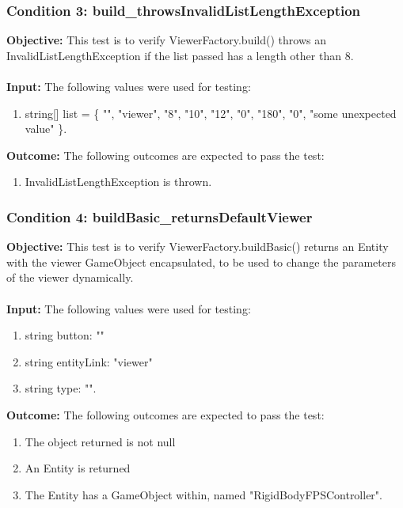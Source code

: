 \documentclass[a4paper,12pt]{article}
\begin{document}
		\subsubsection{Condition 3: build\_throwsInvalidListLengthException}
			\textbf{Objective:} This test is to verify ViewerFactory.build() throws an InvalidListLengthException if the list passed has a length other than 8.\\\\
			\textbf{Input:} The following values were used for testing:
				\begin{enumerate}
					\item string[] list = \{ "", "viewer", "8", "10", "12", "0", "180", "0", "some unexpected value" \}.
				\end{enumerate}
			\textbf{Outcome:} The following outcomes are expected to pass the test:
				\begin{enumerate}
					\item InvalidListLengthException is thrown.
				\end{enumerate}
		\subsubsection{Condition 4: buildBasic\_returnsDefaultViewer}
			\textbf{Objective:} This test is to verify ViewerFactory.buildBasic() returns an Entity with the viewer GameObject encapsulated, to be used to change the parameters of the viewer dynamically.\\\\
			\textbf{Input:} The following values were used for testing:
				\begin{enumerate}
					\item string button: ""
					\item string entityLink: "viewer"
					\item string type: "".
				\end{enumerate}
			\textbf{Outcome:} The following outcomes are expected to pass the test:
				\begin{enumerate}
					\item The object returned is not null
					\item An Entity is returned
					\item The Entity has a GameObject within, named "RigidBodyFPSController".
				\end{enumerate}
\end{document}
